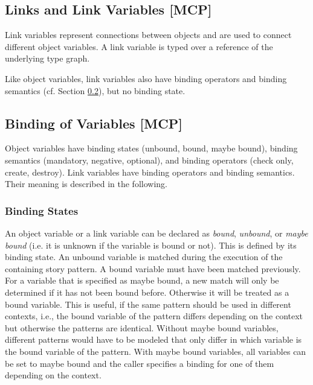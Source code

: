 \subsection{Links and Link Variables [MCP]}
\label{sec:StoryPatterns:links}

Link variables represent connections between objects and are used to connect
different object variables. A link variable is typed over a reference of the underlying
type graph.

Like object variables, link variables also have binding
operators and binding semantics (cf. Section \ref{sec:StoryPatterns:binding}), but no binding state.




\subsection{Binding of Variables [MCP]}
\label{sec:StoryPatterns:binding}

Object variables have binding states (unbound, bound, maybe
bound), binding semantics (mandatory, negative, optional), and binding operators
(check only, create, destroy). Link variables have binding
operators and binding semantics.
Their meaning is described in the following. 


\subsubsection{Binding States}
\label{sec:StoryPatterns:binding:states}
An object variable or a link variable can be declared as \emph{bound}, \emph{unbound}, or
\emph{maybe bound} (i.e. it is unknown if the variable is bound or not). This is
defined by its binding state. An unbound variable is matched during the
execution of the containing story pattern. 
A bound variable must have been matched previously. 
For a variable that is specified as maybe bound, a new match will only be
determined if it has not been bound before. 
Otherwise it will be treated as a bound variable.
This is useful, if the same pattern should be used in different contexts, i.e., the bound variable of the pattern differs depending on the context but otherwise the patterns are identical.
Without maybe bound variables, different patterns would have to be modeled that only differ in which variable is the bound variable of the pattern.
With maybe bound variables, all variables can be set to maybe bound and the caller specifies a binding for one of them depending on the context.

